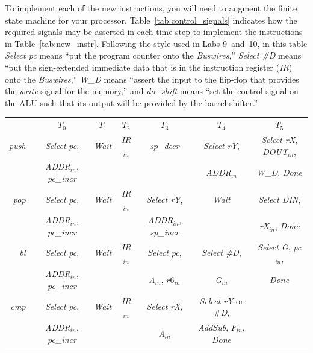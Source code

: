 \documentclass[epsfig,10pt,fullpage]{article} \addtolength{\textwidth}{1.5in}
\begin{document}
To implement each of the new instructions, you will need to augment the finite state
machine for your processor. Table~\ref{tab:control_signals} indicates how the required 
signals may be asserted in each time step to implement the instructions in 
Table~\ref{tab:new_instr}. Following the style used in Labs 9~and~10, in this table
{\it Select pc} means ``put the program counter onto
the {\it Buswires},'' {\it Select \#D} means ``put the sign-extended immediate data that
is in the instruction register ({\it IR}) onto the
{\it Buswires},'' {\it W\_D} means ``assert the input to the flip-flop that provides the {\it write}
signal for the memory,'' and {\it do\_shift} means ``set the control signal on the ALU
such that its output will be provided by the barrel shifter.''

\begin{table}[H]
\begin{center}
\begin{tabular}{r|c|c|c|c|c|c|}
\multicolumn{1}{c}{~} & \multicolumn{1}{c}{$T_0$} & \multicolumn{1}{c}{$T_1$} & \multicolumn{1}{c}{$T_2$} & \multicolumn{1}{c}{$T_3$} & \multicolumn{1}{c}{$T_4$} & \multicolumn{1}{c}{$T_5$} \rule[-0.075in]{0in}{0.25in}\\ \cline{2-7}
{\it push~} & {\it Select} {\it pc}, & {\it Wait} & {\it IR}$_{in}$ &
\rule[-0.075in]{0in}{0.25in}{\it sp\_decr}& {\it Select rY}, & {\it Select rX}, {\it DOUT}$_{in}$, \\
~ & {\it ADDR}$_{in}$, {\it pc\_incr} & {\it ~} & ~ & ~ & {\it ADDR}$_{in}$ & {\it W\_D}, {\it Done} \\ \cline{2-7}
{\it pop~} & {\it Select} {\it pc}, &  {\it Wait} & {\it IR}$_{in}$ &
\rule[-0.075in]{0in}{0.25in}{\it Select rY}, & {\it Wait} & {\it Select DIN}, \\
~ & {\it ADDR}$_{in}$, {\it pc\_incr} & {\it ~} & ~ & {\it ADDR}$_{in}$, {\it sp\_incr} &
{\it ~} &
{\it rX}$_{in}$, {\it Done} \\ \cline{2-7}
\rule[-0.075in]{0in}{0.25in}{\it bl~} & {\it Select} {\it pc}, &  {\it Wait} & {\it
IR}$_{in}$ & {\it Select pc}, & {\it Select \#D}, & {\it Select G}, {\it pc$_{in}$}, \\
~ & {\it ADDR}$_{in}$, {\it pc\_incr} & {\it ~} & ~ & {\it A}$_{in}$, $r6_{in}$ &  {\it G$_{in}$} & {\it Done} \\
\cline{2-7}
\rule[-0.075in]{0in}{0.25in}{\it cmp~} & {\it Select} {\it pc}, &  {\it Wait} & {\it IR}$_{in}$ & {\it Select} {\it rX}, & {\it Select} {\it rY} or \#{\it D}, & \\
~ & {\it ADDR}$_{in}$, {\it pc\_incr} & {\it ~} & ~ & {\it A$_{in}$} & {\it AddSub}, $F_{in}$, {\it Done} & \\

\end{tabular}
\end{center}
\end{table}
\end{document}
